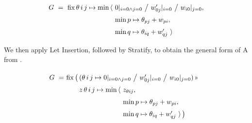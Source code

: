 \begin{center}
\end{center}

\begin{equation}
  \renewcommand\arraystretch{1.5}
  \begin{array}{@{}l@{}l@{}l@{}}
    G ~=~ \fix \theta\,i\,j\mapsto{}
	      & \min\,\langle~ & 0|_{i=0\land j=0} ~\big/~ w'_{0j}|_{i=0} ~\big/~ w_{i0}|_{j=0}, \\
	      & & \min p\mapsto\theta_{pj}+w_{pi}, \\
	      & & \min q\mapsto\theta_{iq}+w'_{qj} ~\rangle
  \end{array}
\end{equation}

We then apply Let Insertion, followed by Stratify, to obtain the general form of A from .

\begin{center}
\end{center}

\begin{equation}
  \renewcommand\arraystretch{1.5}
  \begin{array}{@{}l@{}l@{}l@{}l@{}}
    G ~=~ & \fix \big(\,& \lspan2{(\theta\,i\,j\mapsto 0|_{i=0\land j=0} ~\big/~ w'_{0j}|_{i=0} ~\big/~ w_{i0}|_{j=0})\applt} \\
	      & & z\,\theta\,i\,j \mapsto \min\,\langle~& z_{\theta ij}, \\
	      & & & \min p\mapsto\theta_{pj}+w_{pi}, \\
	      & & & \min q\mapsto\theta_{iq}+w'_{qj} ~\rangle\,\big)
  \end{array}
\end{equation}

